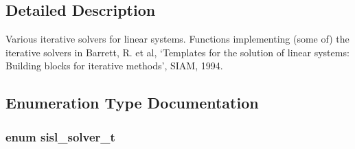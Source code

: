 \subsection{Detailed Description}
Various iterative solvers for linear systems. Functions implementing (some of) the iterative solvers in Barrett, R. et al, `\-Templates for the solution of linear systems\-: Building blocks for iterative methods', S\-I\-A\-M, 1994. 

\subsection{Enumeration Type Documentation}
\hypertarget{group__solver_ga1db83bd06f9de0d0a3375f66a57d8f7b}{
\subsubsection[{sisl\-\_\-solver\-\_\-t}]{\setlength{\rightskip}{0pt plus 5cm}enum {\bf sisl\-\_\-solver\-\_\-t}}}\label{group__solver_ga1db83bd06f9de0d0a3375f66a57d8f7b}
